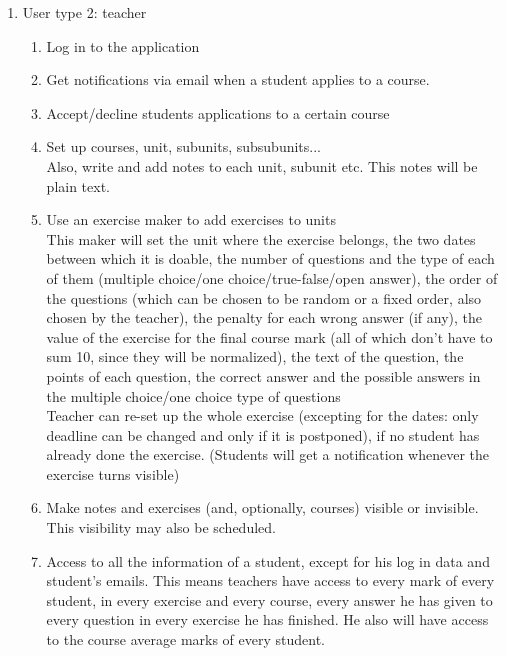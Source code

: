 \documentclass{article}
\begin{document}
\begin{enumerate}
\begin{enumerate}
\begin{enumerate}
\begin{enumerate}
			\end{enumerate}
			\item User type 2: teacher
			\begin{enumerate}
				\item Log in to the application\\
				\item Get notifications via email when a student applies to a course.\\
				\item Accept/decline students applications to a certain course\\
				\item Set up courses, unit, subunits, subsubunits...\\
				Also, write and add  notes to each unit, subunit etc. This notes will be plain text.\\
				\item Use an exercise maker to add exercises to units\\
				This maker will set the unit where the exercise belongs, the two dates between which it is doable, the number of questions and the type of each of them (multiple choice/one choice/true-false/open answer), the order of the questions (which can be chosen to be random or a fixed order, also chosen by the teacher), the penalty for each wrong answer (if any), the value of the exercise for the final course mark (all of which don't have to sum 10, since they will be normalized), the text of the question, the points of each question, the correct answer and the possible answers in the multiple choice/one choice type of questions\\
				Teacher can re-set up the whole exercise (excepting for the dates: only deadline can be changed and only if it is postponed), if no student has already done the exercise. (Students will get a notification whenever the exercise turns visible)\\
				\item Make notes and exercises (and, optionally, courses) visible or invisible. This visibility may also be scheduled.\\
				\item Access to all the information of a student, except for his log in data and student's emails. This means teachers have access to every mark of every student, in every exercise and every course, every answer he has given to every question in every exercise he has finished. He also will have access to the course average marks of every student.\\

\end{enumerate}
\end{enumerate}
\end{enumerate}
\end{enumerate}
\end{document}
